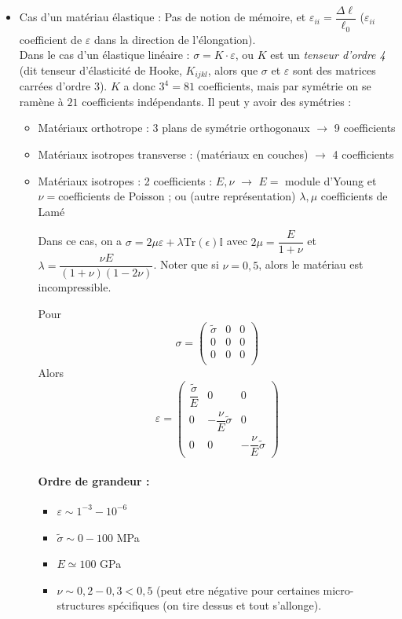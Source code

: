 \documentclass{article}
\begin{document}
\begin{itemize}
\item Cas d'un matériau élastique : Pas de notion de mémoire, et $\varepsilon_{ii} = \dfrac{\Delta \ell}{\ell_0}$ ($\varepsilon_{ii}$ coefficient de $\varepsilon$ dans la direction de l'élongation).\\
Dans le cas d'un élastique linéaire : $\sigma = K\cdot\varepsilon$, ou $K$ est un \emph{tenseur d'ordre 4} (dit tenseur d'élasticité de Hooke, $K_{ijkl}$, alors que $\sigma$ et $\varepsilon$ sont des matrices carrées d'ordre 3). $K$ a donc $3^4=81$ coefficients, mais par symétrie on se ramène à $21$ coefficients indépendants. Il peut y avoir des symétries :
\begin{itemize}[label=\textbullet]
\item Matériaux orthotrope : 3 plans de symétrie orthogonaux $\to$ 9 coefficients
\item Matériaux isotropes transverse : (matériaux en couches) $\to$ 4 coefficients
\item Matériaux isotropes : 2 coefficients : $E,\nu$ $\to$ $E=$ module d'Young et $\nu=$coefficients de Poisson ; ou (autre représentation) $\lambda,\mu$ coefficients de Lamé

Dans ce cas, on a $\sigma = 2\mu \varepsilon + \lambda \text{Tr}(\epsilon) \mathbb{I}$ avec $2\mu = \dfrac{E}{1+\nu}$ et $\lambda = \dfrac{\nu E}{(1+\nu)(1-2\nu)}$. Noter que si $\nu = 0,5$, alors le matériau est incompressible.

Pour
\[
\sigma = \begin{pmatrix}
\tilde{\sigma} & 0 & 0\\
0 & 0 & 0\\
0 & 0 & 0\\
\end{pmatrix}
\]
Alors 
\[\varepsilon = 
\begin{pmatrix}
\dfrac{\tilde{\sigma}}{E} & 0 & 0\\
0 & -\dfrac{\nu}{E}\tilde{\sigma} & 0\\
0 & 0 & -\dfrac{\nu}{E}\tilde{\sigma}
\end{pmatrix}
\]
\paragraph{Ordre de grandeur :}
\begin{itemize}[label=$\star$]
\item $\varepsilon \sim 1^{-3}-10^{-6}$
\item $\tilde{\sigma}\sim 0-100$ MPa
\item $E \simeq 100$ GPa
\item $\nu \sim 0,2 - 0,3 < 0,5$ (peut etre négative pour certaines micro-structures spécifiques (on tire dessus et tout s'allonge).
\end{itemize}
\end{itemize}
\end{itemize}
\end{document}
